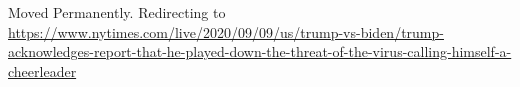 Moved Permanently. Redirecting to
\url{https://www.nytimes.com/live/2020/09/09/us/trump-vs-biden/trump-acknowledges-report-that-he-played-down-the-threat-of-the-virus-calling-himself-a-cheerleader}
